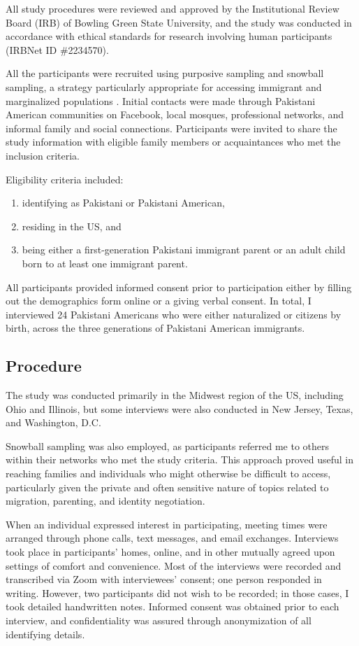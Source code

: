 All study procedures were reviewed and approved by the Institutional Review Board (IRB) of Bowling Green State University, and the study was conducted in accordance with ethical standards for research involving human participants (IRBNet ID \#2234570). 

All the participants were recruited using purposive sampling and snowball sampling, a strategy particularly appropriate for accessing immigrant and marginalized populations \citep{suriPurposefulSamplingQualitative2011}. Initial contacts were made through Pakistani American communities on Facebook, local mosques, professional networks, and informal family and social connections. Participants were invited to share the study information with eligible family members or acquaintances who met the inclusion criteria. 

Eligibility criteria included:
\begin{enumerate}[label=(\Alph*)]
\item identifying as Pakistani or Pakistani American,
\item residing in the US, and
\item being either a first-generation Pakistani immigrant parent or an adult child born to at least one immigrant parent.
\end{enumerate}

All participants provided informed consent prior to participation either by filling out the demographics form online or a giving verbal consent. In total, I interviewed 24 Pakistani Americans who were either naturalized or citizens by birth, across the three generations of Pakistani American immigrants. 

\subsection{Procedure}

The study was conducted primarily in the Midwest region of the US, including Ohio and Illinois, but some interviews were also conducted in New Jersey, Texas, and Washington, D.C.

Snowball sampling was also employed, as participants referred me to others within their networks who met the study criteria. This approach proved useful in reaching families and individuals who might otherwise be difficult to access, particularly given the private and often sensitive nature of topics related to migration, parenting, and identity negotiation.

When an individual expressed interest in participating, meeting times were arranged through phone calls, text messages, and email exchanges. Interviews took place in participants’ homes, online, and in other mutually agreed upon settings of comfort and convenience. Most of the interviews were recorded and transcribed via Zoom with interviewees’ consent; one person responded in writing. However, two participants did not wish to be recorded; in those cases, I took detailed handwritten notes. Informed consent was obtained prior to each interview, and confidentiality was assured through anonymization of all identifying details.

